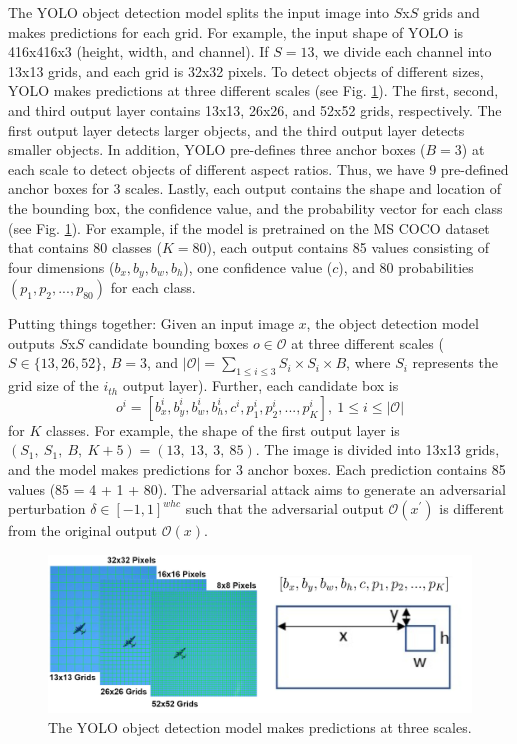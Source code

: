The YOLO object detection model splits the input image into $S$x$S$ grids and makes predictions for each grid. For example, the input shape of YOLO is 416x416x3 (height, width, and channel). If $S=13$, we divide each channel into 13x13 grids, and each grid is 32x32 pixels. To detect objects of different sizes, YOLO makes predictions at three different scales (see Fig. \ref{fig.grid}). The first, second, and third output layer contains 13x13, 26x26, and 52x52 grids, respectively. The first output layer detects larger objects, and the third output layer detects smaller objects. In addition, YOLO pre-defines three anchor boxes ($B=3$) at each scale to detect objects of different aspect ratios. Thus, we have 9 pre-defined anchor boxes for 3 scales. Lastly, each output contains the shape and location of the bounding box, the confidence value, and the probability vector for each class (see Fig. \ref{fig.grid}). For example, if the model is pretrained on the MS COCO dataset \citep{mscoco2014} \citep{moore2020fiftyone} that contains 80 classes ($K=80$), each output contains 85 values consisting of four dimensions ($b_x, b_y, b_w, b_h$), one confidence value ($c$), and 80 probabilities $(p_1, p_2, ..., p_{80})$ for each class.

Putting things together: Given an input image $x$, the object detection model outputs $S$x$S$ candidate bounding boxes $o \in \mathcal{O}$ at three different scales ($S \in \{13,26,52\}$, $B=3$, and $|\mathcal{O}| = \sum_{1 \leq i \leq 3} S_i \times S_i \times B$, where $S_i$ represents the grid size of the $i_{th}$ output layer). Further, each candidate box is
\begin{equation}
 o^i = [b_x^i, b_y^i, b_w^i, b_h^i, c^i, p_1^i, p_2^i, ..., p_K^i],\ 1 \leq i \leq |\mathcal{O}|
\end{equation}
for $K$ classes. For example, the shape of the first output layer is $(S_1,\ S_1,\ B,\ K + 5) = (13,\ 13,\ 3,\ 85)$. The image is divided into 13x13 grids, and the model makes predictions for 3 anchor boxes. Each prediction contains 85 values (85 = 4 + 1 + 80). The adversarial attack aims to generate an adversarial perturbation $\delta \in [-1, 1]^{whc}$ such that the adversarial output $\mathcal{O}(x^{'})$ is different from the original output $\mathcal{O}(x)$.

\begin{figure}[H]
    \centering
    \includegraphics[width=\textwidth]{figures/chapter_detection/detection/grid.jpg}
    \caption{The YOLO object detection model makes predictions at three scales.}
    \label{fig.grid}
\end{figure}

